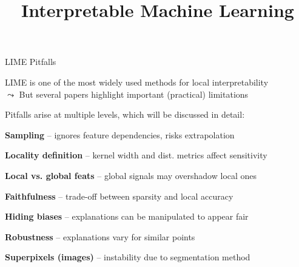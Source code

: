 \documentclass[10pt,compress,t,notes=noshow, xcolor=table]{beamer}
\title{Interpretable Machine Learning}
\begin{document}







\begin{framei}[align=top]{LIME Pitfalls}
\item %
LIME is one of the most widely used methods for local interpretability\\
$\leadsto$ But several papers highlight important (practical) limitations
\item Pitfalls arise at multiple levels, which will be discussed in detail:
\begin{itemizeS}
\item \textbf{Sampling} -- ignores feature dependencies, risks extrapolation
\item \textbf{Locality definition} -- kernel width and dist. metrics affect sensitivity
\item \textbf{Local vs. global feats} -- global signals may overshadow local ones
\item \textbf{Faithfulness} -- trade-off between sparsity and local accuracy
\item \textbf{Hiding biases} -- explanations can be manipulated to appear fair
\item \textbf{Robustness} -- explanations vary for similar points
\item \textbf{Superpixels (images)} -- instability due to segmentation method
\end{itemizeS}
\end{framei}
\end{document}
